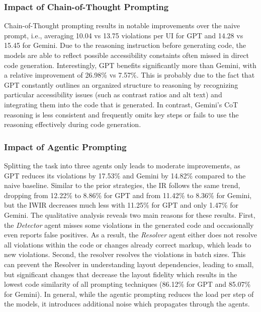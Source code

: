 \subsubsection{Impact of Chain-of-Thought Prompting}
Chain-of-Thought prompting results in notable improvements 
over the naive prompt, i.e., averaging 10.04 vs 13.75 violations
per UI for GPT and 14.28 vs 15.45 for Gemini. Due to 
the reasoning instruction before generating code, 
the models are able to reflect possible accessibility 
constaints often missed in direct code generation.
Interestingly, GPT benefits significantly more 
than Gemini, with a relative improvement of 26.98\% vs 
7.57\%. This is probably due to the fact that GPT constantly 
outlines an organized structure to reasoning by 
recognizing particular accessibility issues 
(such as contrast ratios and alt text) and integrating them into 
the code that is generated. In contrast, Gemini's 
CoT reasoning is less consistent and frequently omits 
key steps or fails to use the reasoning effectively 
during code generation.

\subsubsection{Impact of Agentic Prompting}
Splitting the task into three agents only leads to 
moderate improvements, as GPT reduces its violations 
by 17.53\% and Gemini by 14.82\% compared to the naive 
baseline. Similar to the prior strategies, the IR follows 
the same trend, dropping from 12.22\% to 8.86\% for GPT and
from 11.42\% to 8.36\% for Gemini, but the IWIR decreases much less
with 11.25\% for GPT and only 1.47\% for Gemini.\newline
The qualitative analysis reveals two main reasons for these 
results. First, the \textit{Detector} agent misses some 
violations in the generated code and occasionally even reports 
false positives. As a result, the \textit{Resolver} agent 
either does not resolve all violations within the code 
or changes already correct markup, which leads to new 
violations. Second, the resolver resolves the violations in 
batch sizes. This can prevent the Resolver in understanding 
layout dependencies, leading to small, but significant changes 
that decrease the layout fidelity which results in the 
lowest code similarity of all prompting techniques
(86.12\% for GPT and 85.07\% for Gemini). In general, 
while the agentic prompting reduces the load per step of 
the models, it introduces additional noise which 
propagates through the agents.

